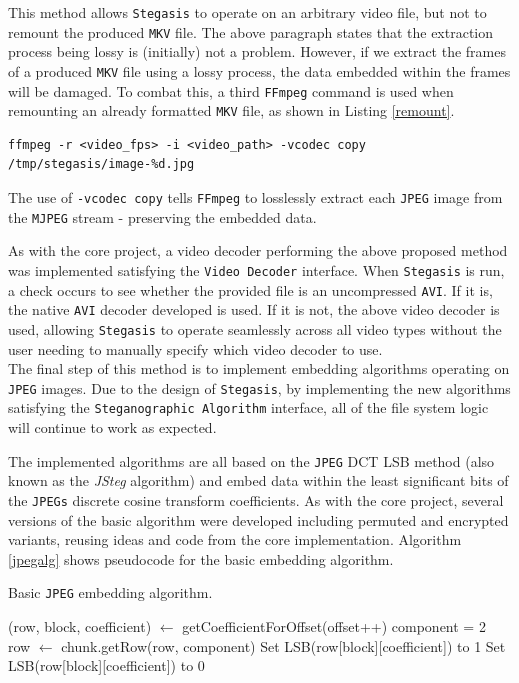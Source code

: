 \documentclass[paper=a4, fontsize=11pt,twoside]{scrartcl}
\numberwithin{table}{section}
\numberwithin{figure}{section}
\numberwithin{algorithm}{section}
\begin{document}
This method allows \texttt{Stegasis} to operate on an arbitrary video file, but not to remount the produced \texttt{MKV} file. The above paragraph states that the extraction process being lossy is (initially) not a problem. However, if we extract the frames of a produced \texttt{MKV} file using a lossy process, the data embedded within the frames will be damaged. To combat this, a third \texttt{FFmpeg} command is used when remounting an already formatted \texttt{MKV} file, as shown in Listing \ref{remount}.

\begin{lstlisting}[caption={\texttt{FFmpeg} \texttt{MKV} \texttt{MJPEG} fram extraction command.}, frame=single, label=remount,upquote=true]
ffmpeg -r <video_fps> -i <video_path> -vcodec copy /tmp/stegasis/image-%d.jpg
\end{lstlisting}

The use of \texttt{-vcodec copy} tells \texttt{FFmpeg} to losslessly extract each \texttt{JPEG} image from the \texttt{MJPEG} stream - preserving the embedded data.

As with the core project, a video decoder performing the above proposed method was implemented satisfying the \texttt{Video Decoder} interface. When \texttt{Stegasis} is run, a check occurs to see whether the provided file is an uncompressed \texttt{AVI}. If it is, the native \texttt{AVI} decoder developed is used. If it is not, the above video decoder is used, allowing \texttt{Stegasis} to operate seamlessly across all video types without the user needing to manually specify which video decoder to use.\\

\noindent
The final step of this method is to implement embedding algorithms operating on \texttt{JPEG} images. Due to the design of \texttt{Stegasis}, by implementing the new algorithms satisfying the \texttt{Steganographic Algorithm} interface, all of the file system logic will continue to work as expected.

The implemented algorithms are all based on the \texttt{JPEG} DCT LSB method (also known as the \textit{JSteg} algorithm) and embed data within the least significant bits of the \texttt{JPEGs} discrete cosine transform coefficients. As with the core project, several versions of the basic algorithm were developed including permuted and encrypted variants, reusing ideas and code from the core implementation. Algorithm \ref{jpegalg} shows pseudocode for the basic embedding algorithm.

\begin{algorithm}
\caption{Basic \texttt{JPEG} embedding algorithm.}
\label{jpegalg}
\begin{algorithmic}[1]
		\State (row, block, coefficient) $\gets$ getCoefficientForOffset(offset++)
		\State component = 2
		\State row $\gets$ chunk.getRow(row, component)
			\State Set LSB(row[block][coefficient]) to 1
		\Else
			\State Set LSB(row[block][coefficient]) to 0
		\EndIf
	\EndFor
\EndFor
\end{algorithmic}
\end{algorithm}
\end{document}
